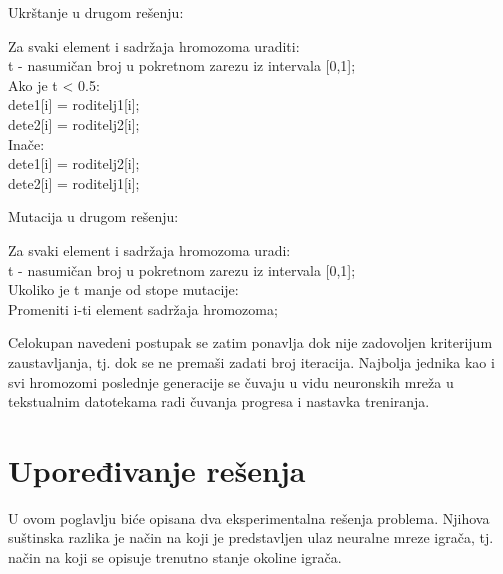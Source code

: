 \documentclass[a4paper]{article}
\begin{document}
\begin{tcolorbox}
\begin{center}
Ukrštanje u drugom rešenju: \\
\end{center}
Za svaki element i sadržaja hromozoma uraditi:\\
\hphantom{tcolorbox}t - nasumičan broj u pokretnom zarezu iz intervala [0,1];\\
\hphantom{tcolorbox}Ako je t < 0.5: \\
\hphantom{tcolorbox}\hphantom{tcolorbox}dete1[i] = roditelj1[i]; \\
\hphantom{tcolorbox}\hphantom{tcolorbox}dete2[i] = roditelj2[i]; \\
\hphantom{tcolorbox}Inače: \\
\hphantom{tcolorbox}\hphantom{tcolorbox}dete1[i] =  roditelj2[i]; \\
\hphantom{tcolorbox}\hphantom{tcolorbox}dete2[i] =  roditelj1[i]; \\
\begin{center}
Mutacija u drugom rešenju:  \\
\end{center}
Za svaki element i sadržaja hromozoma uradi:\\
\hphantom{tcolorbox}t - nasumičan broj u pokretnom zarezu iz intervala [0,1];\\
\hphantom{tcolorbox}Ukoliko je t manje od stope mutacije: \\
\hphantom{tcolorbox}\hphantom{tcolorbox}Promeniti i-ti element sadržaja hromozoma;
\end{tcolorbox}

\par Celokupan navedeni postupak se zatim ponavlja dok nije zadovoljen kriterijum zaustavljanja, tj. dok se ne premaši zadati broj iteracija. Najbolja jednika kao i svi hromozomi poslednje generacije se čuvaju u vidu neuronskih mreža u tekstualnim datotekama radi čuvanja progresa i nastavka treniranja.

\section{Upoređivanje rešenja}
\label{sec:uporedjivanjeResenja}

\par U ovom poglavlju biće opisana dva eksperimentalna rešenja problema. Njihova suštinska razlika je način na koji je predstavljen ulaz neuralne mreze igrača, tj. način na koji se opisuje trenutno stanje okoline igrača.
\end{document}
